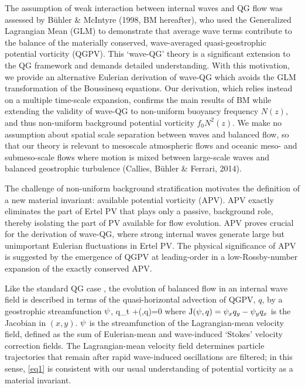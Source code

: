 \documentclass[12pt, oneside]{book}
\begin{document}
The assumption of weak interaction between internal waves and QG flow was assessed by B\"uhler \& McIntyre (1998, BM hereafter), who used the Generalized Lagrangian Mean (GLM) to demonstrate that average wave terms contribute to the balance of the materially conserved, wave-averaged quasi-geostrophic potential vorticity (QGPV).  This `wave-QG' theory is a significant extension to the QG framework and demands detailed understanding.  With this motivation, we provide an alternative Eulerian derivation of wave-QG which avoids the GLM transformation of the Boussinesq equations.  Our derivation, which relies instead on a multiple time-scale expansion, confirms the main results of BM while extending the validity of wave-QG to non-uniform buoyancy frequency $N(z)$, and thus non-uniform background potential vorticity $f_0 N^2(z)$.  We make no assumption about spatial scale separation between waves and balanced flow,  so that our theory is relevant to mesoscale atmospheric flows and oceanic meso- and submeso-scale flows where motion is mixed between large-scale waves and balanced geostrophic turbulence (Callies, B\"uhler \& Ferrari, 2014). \nocite{callies2014transition}

The challenge of non-uniform background stratification motivates the definition of a new material invariant: available potential vorticity (APV).  APV exactly eliminates the part of Ertel PV that plays only a passive, background role, thereby isolating the part of PV available for flow evolution.  APV proves crucial for the derivation of wave-QG, where strong internal waves generate large but unimportant Eulerian fluctuations in Ertel PV.  The physical significance of APV is suggested by the emergence of QGPV at leading-order in a low-Rossby-number expansion of the exactly conserved APV.
 
Like the standard QG case \citep{Pedlosky,Salmon, Vallis}, the evolution of balanced flow in an internal wave field is described in terms of the quasi-horizontal advection of QGPV, $q$, by a geostrophic streamfunction $\psi$,
 \beq
q_t +\sJ(\psiL,q)=0 \com
\label{eq1}
\eeq
where $\mathrm{J}(\psi,q) = \psi_x q_y - \psi_y q_x$ is the Jacobian in $(x,y)$.  $\psi$ is the streamfunction of the Lagrangian-mean velocity field, defined as the sum of Eulerian-mean and wave-induced `Stokes' velocity correction fields.  The Lagrangian-mean velocity field determines particle trajectories that remain after rapid wave-induced oscillations are filtered; in this sense, \eqref{eq1} is consistent with our usual understanding of potential vorticity as a material invariant.
\end{document}
